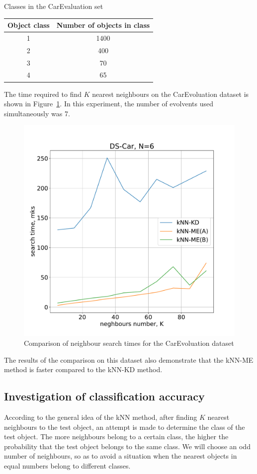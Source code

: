 \documentclass[entropy,article,submit,moreauthors,pdftex]{Definitions/mdpi}
\begin{document}
\begin{paracol}{2}
\begin{specialtable}[H] 
  \caption{Classes in the CarEvaluation set}\label{tab:t2}
	\center
\begin{tabular}{cc}
\toprule
	  Object class & Number of objects in class \\
\midrule													
		1 & 1400 \\ 
		2 & 400 \\
		3 & 70 \\
		4 & 65 \\
\bottomrule
\end{tabular}
\end{specialtable}

The time required to find $K$ nearest neighbours on the CarEvoluation dataset is shown in Figure~\ref{fig6a}. In this experiment, the number of evolvents used simultaneously was 7. 
\begin{figure}
\widefigure
\includegraphics[width=0.5\linewidth]{fig6a.pdf}
\caption{Comparison of neighbour search times for the CarEvoluation dataset\label{fig6a}}
\end{figure}
The results of the comparison on this dataset also demonstrate that the kNN-ME method is faster compared to the kNN-KD method.

\subsection{Investigation of classification accuracy}

According to the general idea of the kNN method, after finding $K$ nearest neighbours to the test object, an attempt is made to determine the class of the test object. The more neighbours belong to a certain class, the higher the probability that the test object belongs to the same class. We will choose an odd number of neighbours, so as to avoid a situation when the nearest objects in equal numbers belong to different classes.


\end{paracol}
\end{document}
